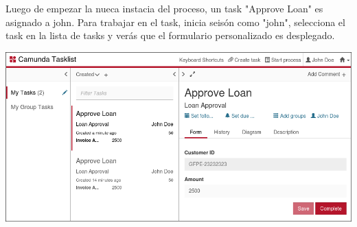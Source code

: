 \documentclass{article}
\begin{document}
Luego de empezar la nueca instacia del proceso, un task "Approve Loan" es asignado a john. Para trabajar en el task, inicia seisón como "john", selecciona el task en la lista de tasks y verás que el formulario personalizado es desplegado.

\begin{center}
\includegraphics[width=\textwidth]{task-form-embedded.png}
\end{center}
\end{document}

